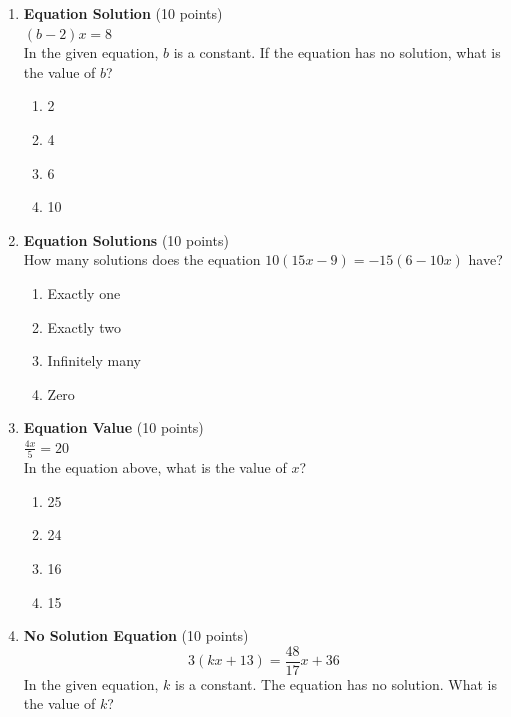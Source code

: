 \begin{enumerate}
  \item \textbf{Equation Solution} (10 points)\\
  $(b-2)x=8$\\
  In the given equation, $b$ is a constant. If the equation has no solution, what is the value of $b$?\\
  \begin{enumerate}[label=(\Alph*)]
    \item 2
    \item 4
    \item 6
    \item 10
  \end{enumerate}
  \begin{subanswer}
  \end{subanswer}

  \item \textbf{Equation Solutions} (10 points)\\
  How many solutions does the equation $10(15x-9)=-15(6-10x)$ have?\\
  \begin{enumerate}[label=(\Alph*)]
    \item Exactly one
    \item Exactly two
    \item Infinitely many
    \item Zero
  \end{enumerate}
  \begin{subanswer}
  \end{subanswer}

  \item \textbf{Equation Value} (10 points)\\
  $\frac{4x}{5}=20$\\
  In the equation above, what is the value of $x$?\\
  \begin{enumerate}[label=(\Alph*)]
    \item 25
    \item 24
    \item 16
    \item 15
  \end{enumerate}
  \begin{subanswer}
  \end{subanswer}

  \item \textbf{No Solution Equation} (10 points)\\
  \[3(kx+13)=\frac{48}{17}x+36\]
  In the given equation, $k$ is a constant. The equation has no solution. What is the value of $k$?
  \begin{subanswer}
  \end{subanswer}


\end{enumerate}
